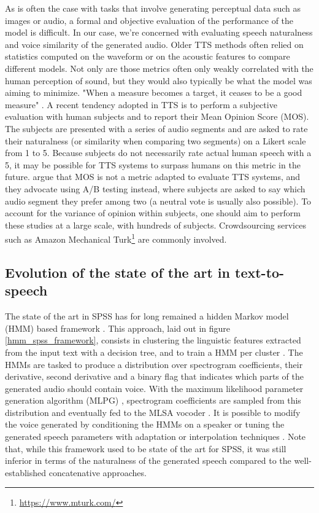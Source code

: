 \documentclass[a4paper, oneside, 12pt, english]{article}
\begin{document}
As is often the case with tasks that involve generating perceptual data such as images or audio, a formal and objective evaluation of the performance of the model is difficult. In our case, we're concerned with evaluating speech naturalness and voice similarity of the generated audio. Older TTS methods often relied on statistics computed on the waveform or on the acoustic features to compare different models. Not only are those metrics often only weakly correlated with the human perception of sound, but they would also typically be what the model was aiming to minimize. "When a measure becomes a target, it ceases to be a good measure" \citep{WhenAMetric}. A recent tendency adopted in TTS is to perform a subjective evaluation with human subjects and to report their Mean Opinion Score (MOS). The subjects are presented with a series of audio segments and are asked to rate their naturalness (or similarity when comparing two segments) on a Likert scale from 1 to 5. Because subjects do not necessarily rate actual human speech with a 5, it may be possible for TTS systems to surpass humans on this metric in the future. \citep{MOSNaturalness} argue that MOS is not a metric adapted to evaluate TTS systems, and they advocate using A/B testing instead, where subjects are asked to say which audio segment they prefer among two (a neutral vote is usually also possible). To account for the variance of opinion within subjects, one should aim to perform these studies at a large scale, with hundreds of subjects. Crowdsourcing services such as Amazon Mechanical Turk\footnote{\url{https://www.mturk.com/}} are commonly involved. 



\subsection{Evolution of the state of the art in text-to-speech}
The state of the art in SPSS has for long remained a hidden Markov model (HMM) based framework \citep{Tokuda-2013}. This approach, laid out in figure \ref{hmm_spss_framework}, consists in clustering the linguistic features extracted from the input text with a decision tree, and to train a HMM per cluster \citep{HMMTTS}. The HMMs are tasked to produce a distribution over spectrogram coefficients, their derivative, second derivative and a binary flag that indicates which parts of the generated audio should contain voice. With the maximum likelihood parameter generation algorithm (MLPG) \citep{Tokuda-2000}, spectrogram coefficients are sampled from this distribution and eventually fed to the MLSA vocoder \citep{MLSA}. It is possible to modify the voice generated by conditioning the HMMs on a speaker or tuning the generated speech parameters with adaptation or interpolation techniques \citep{HMMSpeakerInterpolation}. Note that, while this framework used to be state of the art for SPSS, it was still inferior in terms of the naturalness of the generated speech compared to the well-established concatenative approaches.
\end{document}
